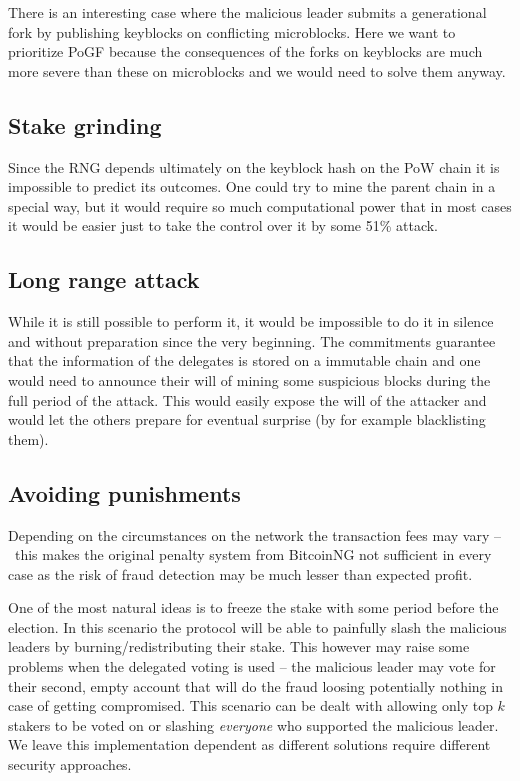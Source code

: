 There is an interesting case where the malicious leader submits a generational
fork by publishing keyblocks on conflicting microblocks.
Here we want to prioritize PoGF because the consequences of the forks on
keyblocks are much more severe than these on microblocks and we would need to
solve them anyway.

\subsection{Stake grinding}

Since the RNG depends ultimately on the keyblock hash on the PoW chain it is
impossible to predict its outcomes. One could try to mine the parent chain
in a special way, but it would require so much computational power that in
most cases it would be easier just to take the control over it by some 51\%
attack.

\subsection{Long range attack}
While it is still possible to perform it, it would be impossible to do it in
silence and without preparation since the very beginning. The commitments
guarantee that the information of the delegates is stored on a immutable chain
and one would need to announce their will of mining some suspicious blocks during
the full period of the attack. This would easily expose the will of the attacker
and would let the others prepare for eventual surprise (by for example
blacklisting them).

\subsection{Avoiding punishments}
Depending on the circumstances on the network the transaction fees may vary
– this makes the original penalty system from BitcoinNG not sufficient in every
case as the risk of fraud detection may be much lesser than expected profit.

One of the most natural ideas is to freeze the stake with some period before the
election. In this scenario the protocol will be able to painfully slash the
malicious leaders by burning/redistributing their stake. This however may raise
some problems when the delegated voting is used – the malicious leader may vote
for their second, empty account that will do the fraud loosing potentially
nothing in case of getting compromised. This scenario can be dealt with allowing only
top $k$ stakers to be voted on or slashing \textit{everyone} who supported the
malicious leader. We leave this implementation dependent as different solutions
require different security approaches.